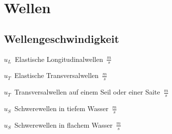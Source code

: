 \section{Wellen}
\subsection{Wellengeschwindigkeit}

\begin{center}
	\begin{minipage}{0.4\textwidth}
		\unit{$u_L$}{Elastische Longitudinalwellen}{$\frac{m}{s}$}
	\end{minipage}%
	\begin{minipage}{0.2\textwidth}
	\end{minipage}
\end{center}
\begin{center}
	\begin{minipage}{0.4\textwidth}
		\unit{$u_T$}{Elastische Transversalwellen}{$\frac{m}{s}$}
	\end{minipage}%
	\begin{minipage}{0.2\textwidth}
	\end{minipage}
\end{center}
\begin{center}
	\begin{minipage}{0.4\textwidth}
		\unit{$u_T$}{Transversalwellen auf einem Seil oder einer Saite}{$\frac{m}{s}$}
	\end{minipage}%
	\begin{minipage}{0.2\textwidth}
	\end{minipage}
\end{center}
\begin{center}
	\begin{minipage}{0.4\textwidth}
		\unit{$u_S$}{Schwerewellen in tiefem Wasser}{$\frac{m}{s}$}
	\end{minipage}%
	\begin{minipage}{0.2\textwidth}
	\end{minipage}
\end{center}
\begin{center}
	\begin{minipage}{0.4\textwidth}
		\unit{$u_S$}{Schwerewellen in flachem Wasser}{$\frac{m}{s}$}
	\end{minipage}%
	\begin{minipage}{0.2\textwidth}
	\end{minipage}
\end{center}
